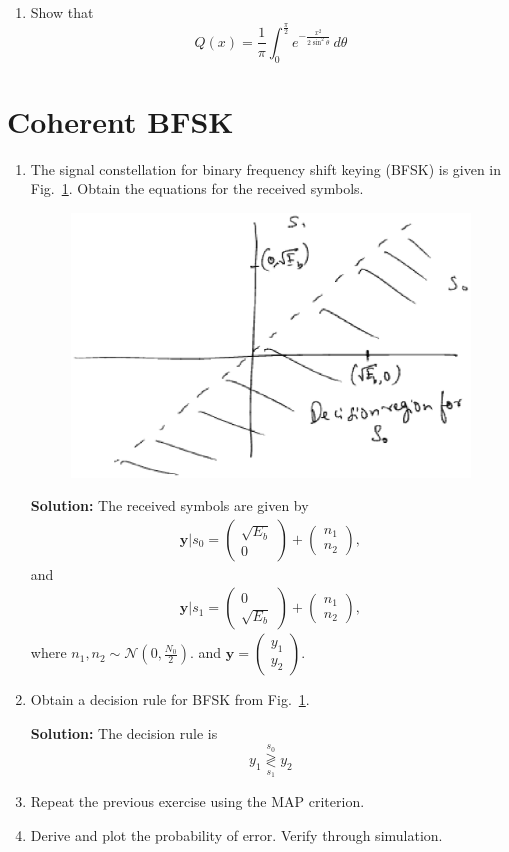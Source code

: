 \documentclass[journal,10pt,twocolumn]{IEEEtran}
\newcommand\figref{Fig.~\ref}
\newcommand{\solution}{\noindent \textbf{Solution: }}
\providecommand{\dec}[2]{\ensuremath{\overset{#1}{\underset{#2}{\gtrless}}}}
\newcommand{\myvec}[1]{\ensuremath{\begin{pmatrix}#1\end{pmatrix}}}
\providecommand{\gauss}[2]{\mathcal{N}\ensuremath{\left(#1,#2\right)}}
\begin{document}
\begin{enumerate}
\item
Show that
\begin{equation}
Q(x) = \frac{1}{\pi}\int^{\frac{\pi}{2}}_{0}e^{-\frac{x^2}{2\sin^2 \theta}}\,d\theta
\end{equation}
\end{enumerate}
\section{Coherent BFSK}
\begin{enumerate}
\item
The signal constellation for binary frequency shift keying (BFSK) is given in \figref{fig:bfsk_const}.
Obtain the equations for the received symbols.

\begin{figure}[H]
\centering
\includegraphics[width=\columnwidth]{./figs/chapter6/bfsk_const.eps}
\caption{}
\label{fig:bfsk_const}
\end{figure}
\solution
The received symbols are given by
\begin{align}
\mathbf{y}|s_0 = 
\myvec{
\sqrt{E_b} \\
0
}
+
\myvec{
 n_{1}\\
n_{2}
},
\end{align}
and 
\begin{align}
\mathbf{y}|s_1 = 
\myvec{
0\\
\sqrt{E_b} 
}
+
\myvec{
n_{1}\\
 n_{2}
},
\end{align}
where $n_1,n_2 \sim \gauss{0}{\frac{N_0}{2}}$. and
$
\mathbf{y} = 
\myvec{
y_{1}\\
 y_{2}
}
$.
\item
Obtain a decision rule for BFSK from \figref{fig:bfsk_const}.

\solution The decision rule is
\begin{equation}
y_1 \dec{s_0}{s_1} y_2
\end{equation}
\item
Repeat the previous exercise using the MAP criterion.

\item
Derive and plot the probability of error.  Verify through simulation.
\end{enumerate}
\end{document}
